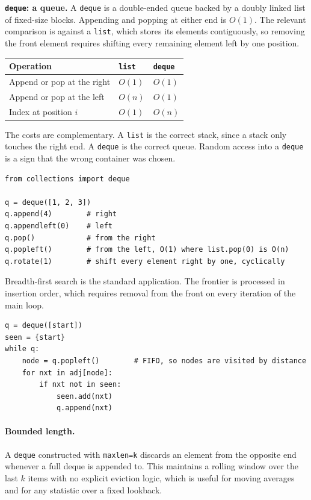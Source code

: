 \medskip

\noindent\textbf{\texttt{deque}: a queue.}
A \texttt{deque} is a double-ended queue backed by a doubly linked list of
fixed-size blocks. Appending and popping at either end is $O(1)$. The relevant
comparison is against a \texttt{list}, which stores its elements contiguously,
so removing the front element requires shifting every remaining element left by
one position.

\begin{center}
\begin{tabular}{lll}
\toprule
\textbf{Operation} & \textbf{\texttt{list}} & \textbf{\texttt{deque}} \\
\midrule
Append or pop at the right & $O(1)$ & $O(1)$ \\
Append or pop at the left  & $O(n)$ & $O(1)$ \\
Index at position $i$      & $O(1)$ & $O(n)$ \\
\bottomrule
\end{tabular}
\end{center}

The costs are complementary. A \texttt{list} is the correct stack, since a
stack only touches the right end. A \texttt{deque} is the correct queue.
Random access into a \texttt{deque} is a sign that the wrong container was
chosen.

\begin{lstlisting}[style=python, caption={deque}]
from collections import deque

q = deque([1, 2, 3])
q.append(4)        # right
q.appendleft(0)    # left
q.pop()            # from the right
q.popleft()        # from the left, O(1) where list.pop(0) is O(n)
q.rotate(1)        # shift every element right by one, cyclically
\end{lstlisting}

Breadth-first search is the standard application. The frontier is processed in
insertion order, which requires removal from the front on every iteration of
the main loop.

\begin{lstlisting}[style=python, caption={BFS frontier}]
q = deque([start])
seen = {start}
while q:
    node = q.popleft()        # FIFO, so nodes are visited by distance
    for nxt in adj[node]:
        if nxt not in seen:
            seen.add(nxt)
            q.append(nxt)
\end{lstlisting}

\paragraph{Bounded length.} A \texttt{deque} constructed with \texttt{maxlen=k}
discards an element from the opposite end whenever a full deque is appended to.
This maintains a rolling window over the last $k$ items with no explicit
eviction logic, which is useful for moving averages and for any statistic over
a fixed lookback.


